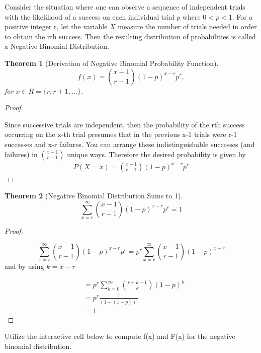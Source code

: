 \documentclass[10pt,]{book}
\theoremstyle{plain}
\newtheorem{theorem}{Theorem}[section]
\theoremstyle{definition}
\theoremstyle{definition}
\theoremstyle{definition}
\numberwithin{equation}{section}
\newcommand{\lt}{ < }
\begin{document}
\par
Consider the situation where one can observe a sequence  of independent trials with the likelihood of a success on each individual trial \(p\) where 
	\( 0 \lt p \lt 1 \).  
	For a positive integer r, let the variable \(X\) measure the number of trials needed in order to obtain the rth success. Then the resulting distribution of probabilities is called a Negative Binomial Distribution.%
\begin{theorem}[{Derivation of Negative Binomial Probability Function}]\label{theorem-42}
\begin{equation*}f(x) = \binom{x - 1}{r-1}(1-p)^{x-r}p^r,\end{equation*}
	for \(x \in R = \{r, r+1, ... \}\).
	\end{theorem}
\begin{proof}\hypertarget{proof-42}{}
 Since successive trials are independent, then the probability of the rth success occurring on the x-th trial presumes that in the previous x-1 trials were r-1 successes and x-r failures. You can arrange these indistinguishable successes (and failures) in \(\binom{x-1}{r-1}\) unique ways. Therefore the desired probability is given by 
			\begin{gather*}
P(X=x) = \binom{x - 1}{r-1}(1-p)^{x-r}p^r
\end{gather*}
\end{proof}
\begin{theorem}[{Negative Binomial Distribution Sums to 1}]\label{theorem-43}
\begin{equation*}\sum_{x=r}^{\infty} {\binom{x - 1}{r-1}(1-p)^{x-r}p^r} = 1\end{equation*}\end{theorem}
\begin{proof}\hypertarget{proof-43}{}

		\begin{equation*}\sum_{x=r}^{\infty} {\binom{x - 1}{r-1}(1-p)^{x-r}p^r} = p^r \sum_{x=r}^{\infty} {\binom{x - 1}{r-1}(1-p)^{x-r}}\end{equation*}
		and by using \(k = x-r\)%

		\begin{align*}
 & = p^r \sum_{k=0}^{\infty} {\binom{r + k - 1}{k}(1-p)^k}\\
 & = p^r \frac{1}{(1-(1-p))^r}\\
 & = 1
\end{align*}
\end{proof}
\par
Utilize the interactive cell below to compute f(x) and F(x) for the negative binomial distribution.
\end{document}
